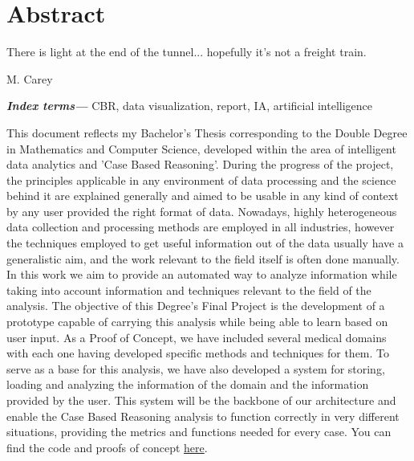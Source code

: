 %
%
%
%
%

\chapter{Abstract}

\begin{FraseCelebre}
\begin{Frase}
There is light at the end of the tunnel... hopefully it's not a freight train.
\end{Frase}
\begin{Fuente}
M. Carey
\end{Fuente}
\end{FraseCelebre}
\providecommand{\keywords}[1]{\textbf{\textit{Index terms---}} #1}
\keywords{CBR, data visualization, report, IA, artificial intelligence}

\bigskip
This document reflects my Bachelor's Thesis corresponding to the Double Degree in Mathematics and Computer Science, developed within the area of intelligent data analytics and 'Case Based Reasoning'. 
During the progress of the project, the principles applicable in any environment of data processing and the science behind it are explained generally and aimed to be usable in any kind of context by any user provided the right format of data.
Nowadays, highly heterogeneous data collection and processing methods are employed in all industries, 
however the techniques employed to get useful information out of the data usually have a generalistic aim, 
and the work relevant to the field itself is often done manually. In this work we aim to provide an automated way to analyze information while taking into account information and techniques relevant to the field of the analysis.
The objective of this Degree's Final Project is the development of a prototype capable of carrying this analysis while being able to learn based on user input. As a Proof of Concept, we have included several medical domains with each one having developed specific methods and techniques for them.
To serve as a base for this analysis, we have also developed a system for storing, loading and analyzing the information of the domain and the information provided by the user. This system will be the backbone of our architecture and enable the Case Based Reasoning analysis to function correctly in very different situations, providing the metrics and functions needed for every case.
You can find the code and proofs of concept \href{https://www.github.com/jorses/tfg}{here}.
